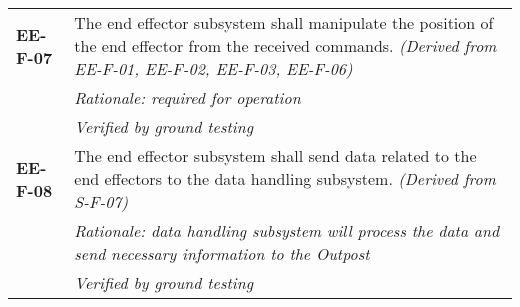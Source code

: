 \begin{longtable}{P{2cm}P{13.25cm}}
\textbf{EE-F-07}	& The end effector subsystem shall manipulate the position of the end effector from the received commands. 
\textit{(Derived from EE-F-01, EE-F-02, EE-F-03, EE-F-06)}\\
 &	\textit{Rationale: required for operation} \\
 &	\textit{Verified by ground testing}	\\
 
\textbf{EE-F-08}	& The end effector subsystem shall send data related to the end effectors to the data handling subsystem. 
\textit{(Derived from S-F-07)} \\
 &	\textit{Rationale: data handling subsystem will process the data and send necessary information to the Outpost} \\
 &	\textit{Verified by ground testing}	
\end{longtable}
\vspace{-15pt}
